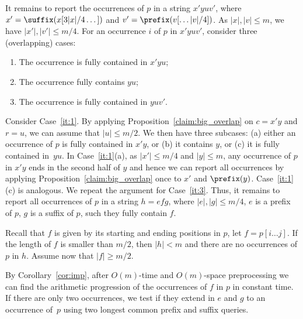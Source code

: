 It remains to report the occurrences of $p$ in a string $x' yu v'$, where $x' = \suffix(x[3|x|/4 \dots])$ and $v' = \prefix(v[\dots |v|/4])$. As $|x|, |v| \le m$, we have $|x'|, |v'| \le m/4$. For an occurrence $i$ of $p$ in $x' yu v'$, consider three (overlapping) cases:
\begin{enumerate}
\item \label{it:1} The occurrence is fully contained in $x'yu$;
\item \label{it:2} The occurrence fully contains $yu$;
\item \label{it:3} The occurrence is fully contained in $yuv'$.
\end{enumerate}
Consider Case~\ref{it:1}. By applying  Proposition~\ref{claim:big_overlap} on $c = x'y$ and $r = u$, we can assume that $|u| \le m/2$. We then have three subcases: (a) either an occurrence of $p$ is fully contained in $x'y$, or (b) it contains $y$, or (c) it is fully contained in~$yu$. In Case~\ref{it:1}(a), as $|x'| \le m/4$ and $|y| \le m$, any occurrence of $p$ in $x'y$ ends in the second half of $y$ and hence we can report all occurrences by applying Proposition~\ref{claim:big_overlap} once to $x'$ and $\prefix(y)$. Case~\ref{it:1}(c) is analogous. We repeat the argument for Case~\ref{it:3}. Thus, it remains to report all occurrences of $p$ in a string $h=efg$, where $|e|, |g| \le m/4$, $e$ is a prefix of $p$, $g$ is a suffix of $p$, such they fully contain $f$.

Recall that $f$ is given by its starting and ending positions in $p$, let $f = p[i \dots j]$. If the length of $f$ is smaller than $m/2$, then $|h|<m$ and there are no occurrences of $p$ in $h$. Assume now that $|f| \ge m/2$.

 
By Corollary~\ref{cor:imp}, after $O(m)$-time and $O(m)$-space preprocessing we can find the arithmetic progression of the occurrences of $f$ in $p$ in constant time. If there are only two occurrences, we test if they extend in $e$ and $g$ to an occurrence of~$p$ using two longest common prefix and suffix queries. 

